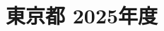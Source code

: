\documentclass[../../hsm_tok_q.tex]{subfiles}
\begin{document}
    \section{東京都 2025年度}
    \subsection{　}
    
    \newpage
    \subsection{　}
    
    \newpage
    \subsection{　}
    
    \newpage
    \subsection{　}
    
    \newpage
    \subsection{　}
    
\end{document}
